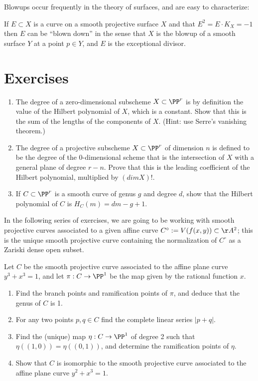 Blowups occur frequently in the theory of surfaces, and are easy to characterize:
\begin{theorem}
If $E\subset X$ is a curve on a smooth projective surface $X$ and
 that $E^2 = E\cdot K_X = -1$ then $E$ can be ``blown down'' in the sense that
 $X$ is the blowup of a smooth surface $Y$ at a point $p\in Y$, and $E$ is the exceptional divisor.
\end{theorem}


\section{Exercises}


\begin{exercise}\label{characterization of degree}
\begin{enumerate}
\item The degree of a zero-dimensional subscheme $X\subset \PP^r$ is by definition the value of the Hilbert polynomial of $X$, which is a constant. Show that
this is the sum of the lengths of the components of $X$. (Hint: use Serre's vanishing theorem.)

\item The degree of a projective subscheme $X\subset \PP^r$ of dimension $n$ is defined to be the degree of the $0$-dimensional scheme
that is the intersection of $X$ with a general plane of degree $r-n$. Prove that this is the leading coefficient of the Hilbert polynomial, multiplied
by $(dim X)!$.

\item If $C\subset \PP^r$ is a smooth curve of genus $g$ and degree $d$, show that the Hilbert polynomial of $C$ is $H_C(m) = dm-g+1$.
 
\end{enumerate}
\end{exercise}

In the following series of exercises, we are going to be working with smooth projective curves associated to a given affine curve $C^\circ := V(f(x,y)) \subset \AA^2$; this is the unique smooth projective curve containing the normalization of $C^\circ$ as a Zariski dense open subset.

\begin{exercise}
Let $C$ be the smooth projective curve associated to the affine plane curve $y^3 +x^3 = 1$, and let $\pi : C \to \PP^1$ be the map given by the rational function $x$.
\begin{enumerate}
\item Find the branch points and ramification points of $\pi$, and deduce that the genus of $C$ is 1.
\item For any two points $p, q \in C$ find the complete linear series $|p+q|$.
\item Find the (unique) map $\eta : C \to \PP^1$ of degree 2 such that $\eta((1,0)) = \eta((0,1))$, and determine the ramification points of $\eta$.
\item Show that $C$ is isomorphic to the smooth projective curve associated to the affine plane curve $y^2 +x^3 = 1$.
\end{enumerate}
\end{exercise}

